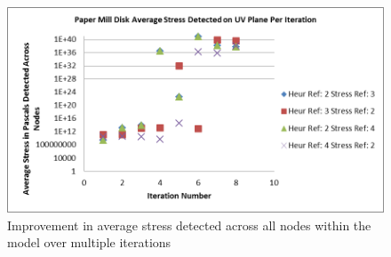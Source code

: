  \begin{figure}[H]
  \centerline{\includegraphics[width=120mm, scale=0.5]{../Graphics/Graphs/PaperMillAverageStressRevealed.png}}
  \caption{Improvement in average stress detected across all nodes within the model over multiple iterations}
\end{figure}


